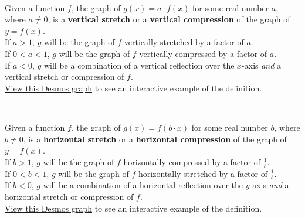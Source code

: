 \begin{myDefinition}~\\[0.5mm]
\begin{minipage}{0.9\linewidth}
Given a function $f$, the graph of $g(x)= a\cdot f(x) $ for some real number $a$, where $a\neq0$, is a {\bf vertical stretch} or a {\bf vertical compression} of the graph of $y=f(x)$.\\[2mm] 
If $a>1$, $g$ will be the graph of $f$ vertically stretched by a factor of $a$.\\
If $0<a<1$, $g$ will be the graph of $f$ vertically compressed by a factor of $a$.\\[2mm] 
If $a<0$, $g$ will be a combination of a vertical reflection over the $x$-axis {\it and} a vertical stretch or compression of $f$.\\[0.4em]
 \href{https://tiny.cc/111Z-VertStretch}{View this Desmos graph} to see an interactive example of the definition. %
\end{minipage}
\begin{minipage}{0.1\linewidth}
\flushright {}
\end{minipage}
\end{myDefinition}



\begin{myDefinition}~\\[0.5mm]
\begin{minipage}{0.9\linewidth}
Given a function $f$, the graph of $g(x) = f(b\cdot x) $ for some real number $b$, where $b\neq0$, is a {\bf horizontal stretch} or a {\bf horizontal compression} of the graph of $y=f(x)$.\\[2mm] 
If $b>1$, $g$ will be the graph of $f$ horizontally compressed by a factor of $\frac{1}{b}$.\\
If $0<b<1$, $g$ will be the graph of $f$ horizontally stretched by a factor of $\frac{1}{b}$.\\[2mm]
If $b<0$, $g$ will be a combination of a horizontal reflection over the $y$-axis {\it and} a horizontal stretch or compression of $f$.\\[0.4em]
 \href{https://tiny.cc/111Z-HorizStretch}{View this Desmos graph} to see an interactive example of the definition.  %
\end{minipage}
\begin{minipage}{0.1\linewidth}
\flushright {}
\end{minipage}
\end{myDefinition}

